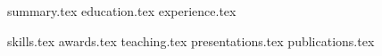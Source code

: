 \documentclass[letterpaper,11pt]{article}
\begin{document}

{summary.tex}
{education.tex}
{experience.tex}



{skills.tex}
{awards.tex}
{teaching.tex}
{presentations.tex}
{publications.tex}
\end{document}
